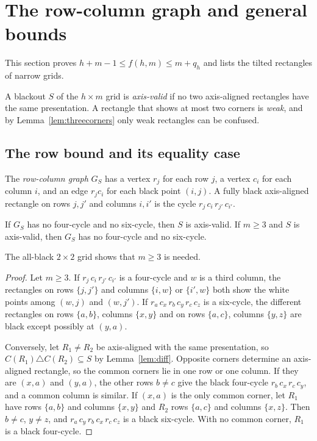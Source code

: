 \section{The row-column graph and general bounds}\label{sec:graph}

This section proves $h+m-1\le f(h,m)\le m+q_h$ and lists the tilted rectangles of narrow grids.

A blackout $S$ of the $h\times m$ grid is \emph{axis-valid} if no two axis-aligned rectangles have the same presentation. A rectangle that shows at most two corners is \emph{weak}, and by Lemma~\ref{lem:threecorners} only weak rectangles can be confused.

\subsection{The row bound and its equality case}

The \emph{row-column graph} $G_S$ has a vertex $r_j$ for each row $j$, a vertex $c_i$ for each column $i$, and an edge $r_jc_i$ for each black point $(i,j)$. A fully black axis-aligned rectangle on rows $j,j'$ and columns $i,i'$ is the cycle $r_j\,c_i\,r_{j'}\,c_{i'}$.

\begin{lemma}\label{lem:girth}
If $G_S$ has no four-cycle and no six-cycle, then $S$ is axis-valid. If $m\ge3$ and $S$ is axis-valid, then $G_S$ has no four-cycle and no six-cycle.
\end{lemma}

The all-black $2\times2$ grid shows that $m\ge3$ is needed.

\begin{proof}
Let $m\ge3$. If $r_j\,c_i\,r_{j'}\,c_{i'}$ is a four-cycle and $w$ is a third column, the rectangles on rows $\{j,j'\}$ and columns $\{i,w\}$ or $\{i',w\}$ both show the white points among $(w,j)$ and $(w,j')$. If $r_a\,c_x\,r_b\,c_y\,r_c\,c_z$ is a six-cycle, the different rectangles on rows $\{a,b\}$, columns $\{x,y\}$ and on rows $\{a,c\}$, columns $\{y,z\}$ are black except possibly at $(y,a)$.

Conversely, let $R_1\ne R_2$ be axis-aligned with the same presentation, so $C(R_1)\triangle C(R_2)\subseteq S$ by Lemma~\ref{lem:diff}. Opposite corners determine an axis-aligned rectangle, so the common corners lie in one row or one column. If they are $(x,a)$ and $(y,a)$, the other rows $b\ne c$ give the black four-cycle $r_b\,c_x\,r_c\,c_y$, and a common column is similar. If $(x,a)$ is the only common corner, let $R_1$ have rows $\{a,b\}$ and columns $\{x,y\}$ and $R_2$ rows $\{a,c\}$ and columns $\{x,z\}$. Then $b\ne c$, $y\ne z$, and $r_a\,c_y\,r_b\,c_x\,r_c\,c_z$ is a black six-cycle. With no common corner, $R_1$ is a black four-cycle.
\end{proof}

